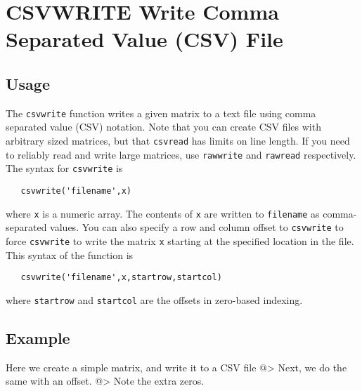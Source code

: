 \section{CSVWRITE Write Comma Separated Value (CSV) File}

\subsection{Usage}

The \verb|csvwrite| function writes a given matrix to a text
file using comma separated value (CSV) notation.  Note that
you can create CSV files with arbitrary sized matrices, but
that \verb|csvread| has limits on line length.  If you need to
reliably read and write large matrices, use \verb|rawwrite| and
\verb|rawread| respectively.  The syntax for \verb|csvwrite| is 
\begin{verbatim}
   csvwrite('filename',x)
\end{verbatim}
where \verb|x| is a numeric array.  The contents of \verb|x| are written
to \verb|filename| as comma-separated values.  You can also specify
a row and column offset to \verb|csvwrite| to force \verb|csvwrite| to
write the matrix \verb|x| starting at the specified location in the 
file.  This syntax of the function is
\begin{verbatim}
   csvwrite('filename',x,startrow,startcol)
\end{verbatim}
where \verb|startrow| and \verb|startcol| are the offsets in zero-based
indexing.  
\subsection{Example}

Here we create a simple matrix, and write it to a CSV file
@>
Next, we do the same with an offset.
@>
Note the extra zeros.

